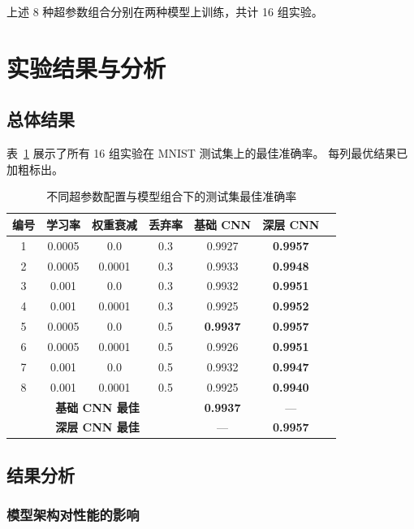 \documentclass[UTF8,a4paper,12pt]{ctexart}
\begin{document}
上述 8 种超参数组合分别在两种模型上训练，共计 16 组实验。

\section{实验结果与分析}

\subsection{总体结果}

表~\ref{tab:results} 展示了所有 16 组实验在 MNIST 测试集上的最佳准确率。
每列最优结果已加粗标出。

\begin{table}[H]
\centering
\caption{不同超参数配置与模型组合下的测试集最佳准确率}
\label{tab:results}
\begin{tabular}{ccccc>{\bfseries}cc}
\toprule
\textbf{编号} & \textbf{学习率} & \textbf{权重衰减} & \textbf{丢弃率} & \textbf{基础 CNN} & \textbf{深层 CNN} \\
\midrule
1 & 0.0005 & 0.0    & 0.3 & 0.9927 & \textbf{0.9957} \\
2 & 0.0005 & 0.0001 & 0.3 & 0.9933 & 0.9948 \\
3 & 0.001  & 0.0    & 0.3 & 0.9932 & 0.9951 \\
4 & 0.001  & 0.0001 & 0.3 & 0.9925 & 0.9952 \\
5 & 0.0005 & 0.0    & 0.5 & \textbf{0.9937} & \textbf{0.9957} \\
6 & 0.0005 & 0.0001 & 0.5 & 0.9926 & 0.9951 \\
7 & 0.001  & 0.0    & 0.5 & 0.9932 & 0.9947 \\
8 & 0.001  & 0.0001 & 0.5 & 0.9925 & 0.9940 \\
\midrule
\multicolumn{4}{c}{\textbf{基础 CNN 最佳}} & \textbf{0.9937} & --- \\
\multicolumn{4}{c}{\textbf{深层 CNN 最佳}} & --- & \textbf{0.9957} \\
\bottomrule
\end{tabular}
\end{table}

\subsection{结果分析}

\subsubsection{模型架构对性能的影响}
\end{document}
